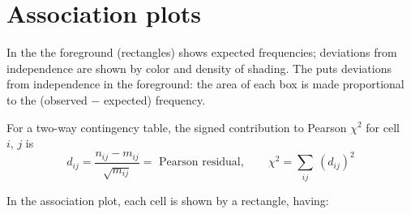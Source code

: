 \documentclass[10pt,krantz2]{krantz}\usepackage[]{graphicx}\usepackage[]{color}
\begin{document}
\section{Association plots}\label{sec:twoway-assoc}
In the  the foreground (rectangles) shows expected
frequencies; deviations from independence are shown by color and
density of shading.  The 
\citep{Cohen:80,Friendly:91}
puts deviations from independence in the foreground:  the area
of each box is made proportional to the
(observed $-$ expected) frequency.

For a two-way contingency table, the signed contribution to Pearson
\(\chi^2\) for cell \(i, \, j\) is
\begin{equation}\label{eq:Pearson-residual}
  d_{ij}  =
  \frac{ n_{ij} - m_{ij} } { \sqrt { m_{ij} } }
 = \mbox{ Pearson residual},
  \qquad
  \chi^2 = \sum_{ij} \:  ( d_{ij} )^2
\end{equation}

In the association plot, each cell is shown by a
rectangle, having:
\end{document}
